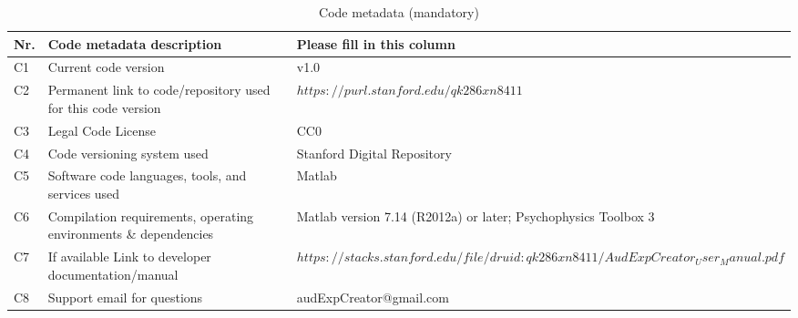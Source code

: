 \documentclass[preprint,12pt, a4paper]{elsarticle}
\begin{document}
\begin{table}[!h]
\begin{tabular}{|l|p{6.5cm}|p{6.5cm}|}
\hline
\textbf{Nr.} & \textbf{Code metadata description} & \textbf{Please fill in this column} \\
\hline
C1 & Current code version & v1.0 \\
\hline
C2 & Permanent link to code/repository used for this code version & $https://purl.stanford.edu/qk286xn8411$ \\
\hline
C3 & Legal Code License   & CC0 \\
\hline
C4 & Code versioning system used & Stanford Digital Repository \\
\hline
C5 & Software code languages, tools, and services used & Matlab \\
\hline
C6 & Compilation requirements, operating environments \& dependencies & Matlab version 7.14 (R2012a) or later; Psychophysics Toolbox 3 \\
\hline
C7 & If available Link to developer documentation/manual & $https://stacks.stanford.edu/file/druid:qk286xn8411/AudExpCreator_User_Manual.pdf$\\
\hline
C8 & Support email for questions & audExpCreator@gmail.com\\
\hline
\end{tabular}
\caption{Code metadata (mandatory)}
\label{} 
\end{table}


\end{document}
